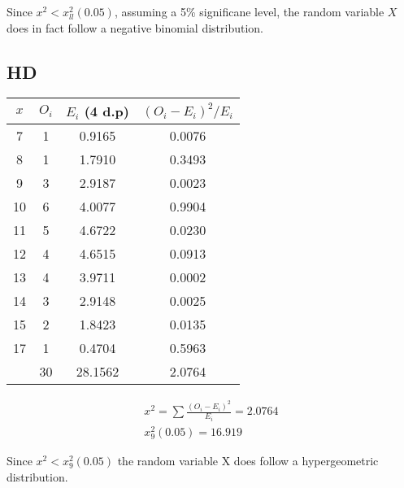 \documentclass{article}
\begin{document}
Since $ x^2 < x^2_{ll}(0.05) $, assuming a 5\% significane level,
the random variable $ X $ does in fact follow a negative binomial
distribution.

\subsection{HD}
\begin{center}
  \begin{tabular}{|c|c|c|c|}
  \hline
    $ x $ & $ O_i $ & $ E_i $ (4 d.p) & $(O_i - E_i)^2 / E_i$ \\
    \hline
    \hline
    7  & 1 & 0.9165 & 0.0076 \\
    8  & 1 & 1.7910 & 0.3493 \\
    9  & 3 & 2.9187 & 0.0023 \\
    10 & 6 & 4.0077 & 0.9904 \\
    11 & 5 & 4.6722 & 0.0230 \\
    12 & 4 & 4.6515 & 0.0913 \\
    13 & 4 & 3.9711 & 0.0002 \\
    14 & 3 & 2.9148 & 0.0025 \\
    15 & 2 & 1.8423 & 0.0135 \\
    17 & 1 & 0.4704 & 0.5963 \\
    \hline
    \hline
       & 30& 28.1562& 2.0764 \\
    \hline
  \end{tabular}
\end{center}

\begin{gather*}
  x^2 = \sum \frac{(O_i - E_i)^2}{E_i} = 2.0764 \\[5pt]
  x^2_9(0.05) = 16.919
\end{gather*}

Since $ x^2 < x^2_9(0.05) $ the random variable X does 
follow a hypergeometric distribution.
\end{document}
